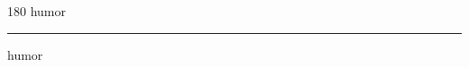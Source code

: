 
\begin{frame}
\begin{center}
\begin{turn}{180}
{\fontsize{2.5cm}{1em}\selectfont humor}
\end{turn}
\vspace{1em}\par  
\hrule
\vspace{1em}\par  
{\fontsize{2.5cm}{1em}\selectfont humor}
\end{center}
\end{frame}
